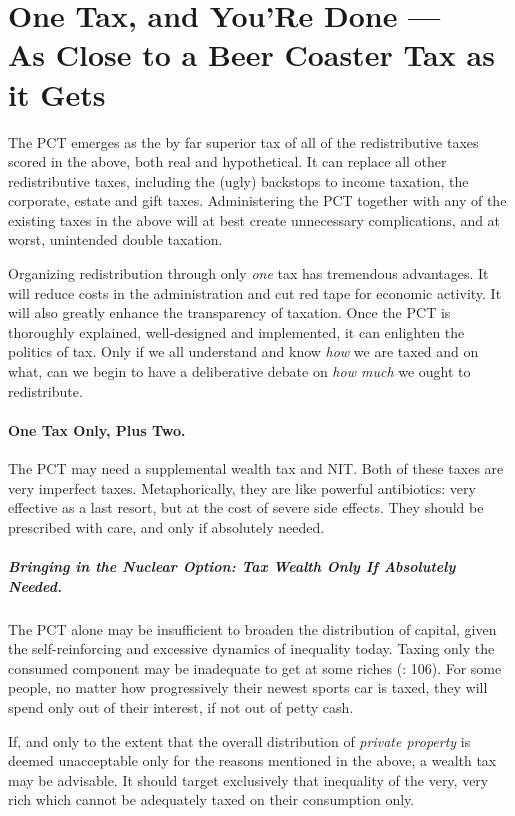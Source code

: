 

\section[One Tax Only]{One Tax, and You'Re Done ---\\As Close to a Beer Coaster Tax as it Gets}
\label{sec:OneTax} The PCT emerges as the by far superior tax of all of the redistributive taxes scored in the above, both real and hypothetical. It can replace all other redistributive taxes, including the (ugly) backstops to income taxation, the corporate, estate and gift taxes. Administering the PCT together with any of the existing taxes in the above will at best create unnecessary complications, and at worst, unintended double taxation.

Organizing redistribution through only \emph{one} tax has tremendous advantages. It will reduce costs in the administration and cut red tape for economic activity. It will also greatly enhance the transparency of taxation. Once the PCT is thoroughly explained, well-designed and implemented, it can enlighten the politics of tax. Only if we all understand and know \emph{how} we are taxed and on what, can we begin to have a deliberative debate on \emph{how much} we ought to redistribute.

\paragraph{One Tax Only, Plus Two.} The PCT may need a supplemental wealth tax and NIT. Both of these taxes are very imperfect taxes. Metaphorically, they are like powerful antibiotics: very effective as a last resort, but at the cost of severe side effects. They should be prescribed with care, and only if absolutely needed.  

\subparagraph{Bringing in the Nuclear Option: Tax Wealth Only If Absolutely Needed.} The PCT alone may be insufficient to broaden the distribution of capital, given the self-reinforcing and excessive dynamics of inequality today. Taxing only the consumed component may be inadequate to get at some riches (\citealt{Shaviro2004}: 106). For some people, no matter how progressively their newest sports car is taxed, they will spend only out of their interest, if not out of petty cash.

If, and only to the extent that the overall distribution of \emph{private property} is deemed unacceptable only for the reasons mentioned in the above, a wealth tax may be advisable. It should target exclusively that inequality of the very, very rich which cannot be adequately taxed on their consumption only.

